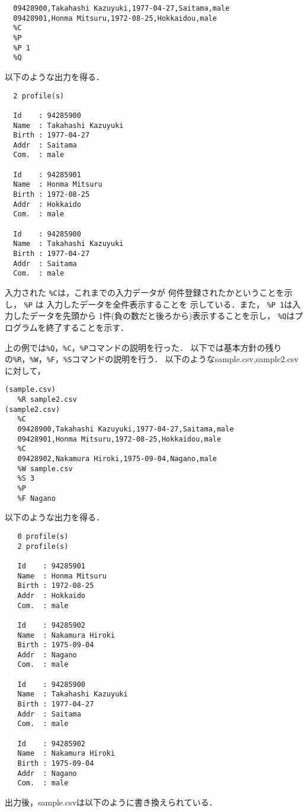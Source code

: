 \documentclass[a4paper,11pt]{jarticle}
\begin{document}
{\fontsize{10pt}{11pt} \selectfont
 \begin{verbatim}
  09428900,Takahashi Kazuyuki,1977-04-27,Saitama,male
  09428901,Honma Mitsuru,1972-08-25,Hokkaidou,male
  %C
  %P
  %P 1
  %Q
 \end{verbatim}
}

\noindent 
以下のような出力を得る．

{\fontsize{10pt}{11pt} \selectfont
 \begin{verbatim}
  2 profile(s)
   
  Id    : 94285900
  Name  : Takahashi Kazuyuki
  Birth : 1977-04-27
  Addr  : Saitama
  Com.  : male

  Id    : 94285901
  Name  : Honma Mitsuru
  Birth : 1972-08-25
  Addr  : Hokkaido
  Com.  : male
  
  Id    : 94285900
  Name  : Takahashi Kazuyuki
  Birth : 1977-04-27
  Addr  : Saitama
  Com.  : male
 \end{verbatim}
}

\noindent
入力された
\verb|%C|は，これまでの入力データが
何件登録されたかということを示し，
\verb|%P| は 入力したデータを全件表示することを
示している．また，
\verb|%P 1|は入力したデータを先頭から
1件(負の数だと後ろから)表示することを示し，
\verb|%Q|はプログラムを終了することを示す．

上の例では\verb|%Q|，\verb|%C|，\verb|%P|コマンドの説明を行った．
以下では基本方針の残りの\verb|%R|，\verb|%W|，\verb|%F|，\verb|%S|コマンドの説明を行う．
以下のようなsample.csv,sample2.csvに対して，

{\fontsize{10pt}{11pt} \selectfont
 \begin{verbatim}
(sample.csv)
   %R sample2.csv
(sample2.csv)
   %C
   09428900,Takahashi Kazuyuki,1977-04-27,Saitama,male
   09428901,Honma Mitsuru,1972-08-25,Hokkaidou,male
   %C
   09428902,Nakamura Hiroki,1975-09-04,Nagano,male
   %W sample.csv
   %S 3
   %P  
   %F Nagano
  \end{verbatim}
}
\noindent
以下のような出力を得る．
{\fontsize{10pt}{11pt} \selectfont
 \begin{verbatim}
   0 profile(s)  
   2 profile(s)
  
   Id    : 94285901
   Name  : Honma Mitsuru
   Birth : 1972-08-25
   Addr  : Hokkaido
   Com.  : male

   Id    : 94285902
   Name  : Nakamura Hiroki
   Birth : 1975-09-04
   Addr  : Nagano
   Com.  : male
  
   Id    : 94285900
   Name  : Takahashi Kazuyuki
   Birth : 1977-04-27
   Addr  : Saitama
   Com.  : male  
   
   Id    : 94285902
   Name  : Nakamura Hiroki
   Birth : 1975-09-04
   Addr  : Nagano
   Com.  : male  
 \end{verbatim}
}
\noindent
出力後，sample.csvは以下のように書き換えられている．
\end{document}
